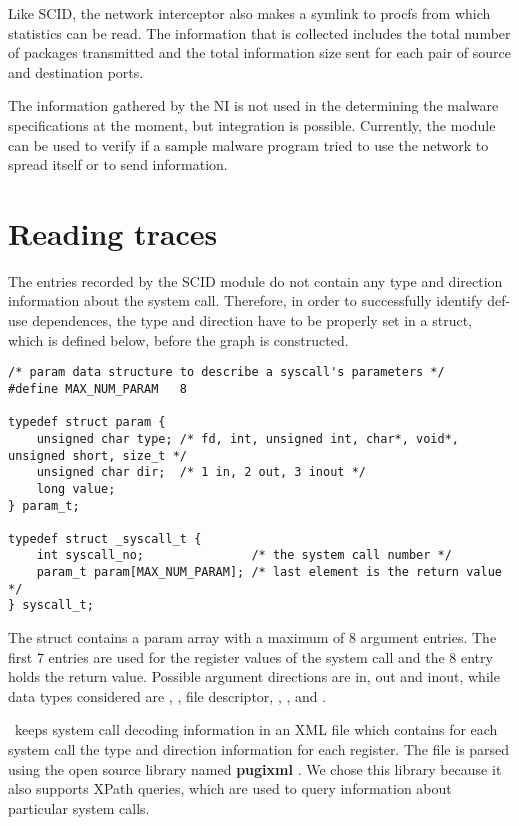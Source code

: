 Like SCID, the network interceptor also makes a symlink to procfs from which statistics can be read. The information that is collected includes the total number of packages transmitted and the total information size sent for each pair of source and destination ports.

The information gathered by the NI is not used in the determining the malware specifications at the moment, but integration is possible. Currently, the module can be used to verify if a sample malware program tried to use the network to spread itself or to send information.

\section{Reading traces}
\label{fourth:read-traces}

The entries recorded by the SCID module do not contain any type and direction information about the system call. Therefore, in order to successfully identify def-use dependences, the type and direction have to be properly set in a  struct, which is defined below, before the graph is constructed.

\lstset{language=C,caption=parameter data structures,label=lst:param-struct}
\begin{lstlisting}
/* param data structure to describe a syscall's parameters */
#define MAX_NUM_PARAM	8

typedef struct param {
	unsigned char type; /* fd, int, unsigned int, char*, void*, unsigned short, size_t */
	unsigned char dir;  /* 1 in, 2 out, 3 inout */
	long value;
} param_t;

typedef struct _syscall_t {
	int syscall_no;               /* the system call number */
	param_t param[MAX_NUM_PARAM]; /* last element is the return value */
} syscall_t;
\end{lstlisting}

The  struct contains a param array with a maximum of 8 argument entries. The first 7 entries are used for the register values of the system call and the 8 entry holds the return value.
Possible argument directions are  in, out and inout, while data types considered are , , file descriptor, , ,  and .

\project\ keeps system call decoding information in an XML file which contains for each system call the type and direction information for each register. The file is parsed using the open source library named \textbf{pugixml} \cite{pugixml-library}. We chose this library because it also supports XPath queries, which are used to query information about particular system calls.

